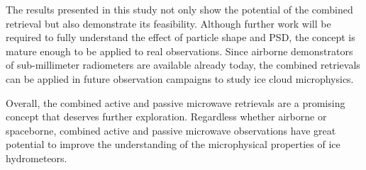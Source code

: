 \documentclass[journal abbreviation, manuscript]{copernicus}
\begin{document}
The results presented in this study not only show the potential of the combined
retrieval but also demonstrate its feasibility. Although further work will be
required to fully understand the effect of particle shape and PSD, the concept
is mature enough to be applied to real observations. Since airborne
demonstrators of sub-millimeter radiometers are available already today, the
combined retrievals can be applied in future observation campaigns to study ice
cloud microphysics.

Overall, the combined active and passive microwave retrievals are a promising
concept that deserves further exploration. Regardless whether airborne or
spaceborne, combined active and passive microwave observations have great
potential to improve the understanding of the microphysical properties of ice
hydrometeors.




\dataavailability{} %



\appendix
\section{}    %

\subsection{}     %


\noappendix       %


\end{document}
